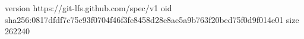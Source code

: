 version https://git-lfs.github.com/spec/v1
oid sha256:0817dfdf7c75c93f0704f46f3fe8458d28e8ae5a9b763f20bed75f0d9f014e01
size 262240
